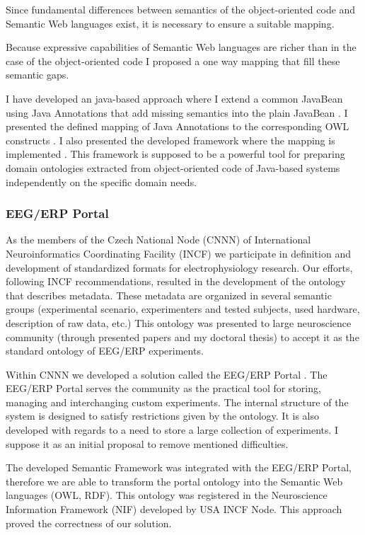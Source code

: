 \documentclass[a4paper, 10pt]{article}
\begin{document}
Since fundamental differences between semantics of the object-oriented code and Semantic Web languages exist, it is necessary to ensure a suitable mapping.

Because expressive capabilities of Semantic Web languages are richer than in the case of the object-oriented code I proposed a one way mapping that fill these semantic gaps.

I have developed an java-based approach where I extend a common JavaBean using Java Annotations that add missing semantics into the plain JavaBean \cite{Jezek10}. I presented the defined mapping of Java Annotations to the corresponding OWL constructs \cite{DBLP:conf/iceis/JezekM11}. I also presented the developed framework where the mapping is implemented \cite{DBLP:conf/biostec/JezekM12}. This framework is supposed to be a powerful tool for preparing domain ontologies extracted from object-oriented code of Java-based systems independently on the specific domain needs.


\subsubsection*{EEG/ERP Portal}

As the members of the Czech National Node (CNNN) of International Neuroinformatics Coordinating Facility (INCF) we participate in definition and development of standardized formats
for electrophysiology research. Our efforts, following INCF recommendations, resulted in the development of the ontology that describes metadata. These metadata are organized in
several semantic groups (experimental scenario, experimenters and tested subjects, used hardware, description of raw data, etc.) This ontology was presented to large neuroscience community (through presented papers and my doctoral thesis) to accept it as the standard ontology of EEG/ERP experiments.

Within CNNN we developed a solution called the EEG/ERP Portal \cite{DBLP:conf/biostec/JezekM10}. The EEG/ERP Portal serves the community as the practical tool for storing, managing and interchanging custom experiments. The internal structure of the system is designed to satisfy restrictions given by the ontology. It is also developed with regards to a need to store a large collection of experiments. I suppose it as an initial proposal to remove mentioned difficulties.

The developed Semantic Framework was integrated \cite{DBLP:conf/biostec/MoucekJP11} with the EEG/ERP Portal, therefore we are able to transform the portal ontology into the Semantic Web languages (OWL, RDF). This ontology was registered in the  Neuroscience Information Framework (NIF) \cite{DBLP:conf/bmei/JezekM11} developed by USA INCF Node. This approach proved the correctness of our solution.
\end{document}
